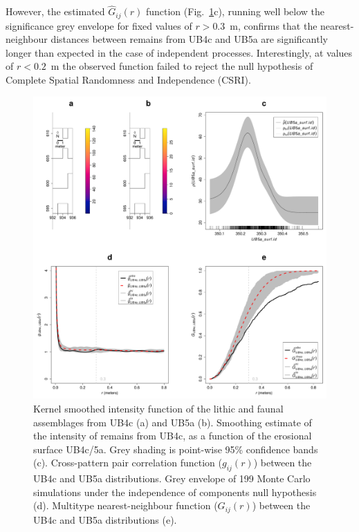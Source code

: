 \documentclass[preprint,authoryear,times]{elsarticle} %
\begin{document}
However, the estimated $\hat{G}_{ij}(r)$ function (Fig.~\ref{fig:12}c), running well below the significance grey envelope for fixed values of $r>0.3$~m, confirms that the nearest-neighbour distances between remains from UB4c and UB5a are significantly longer than expected in the case of independent processes. Interestingly, at values of $r<0.2$~m the observed function failed to reject the null hypothesis of Complete Spatial Randomness and Independence (CSRI).

\begin{figure}[]
  \centering
  \includegraphics[width=1\textwidth]{../artwork/Fig12.pdf}
  \caption{Kernel smoothed intensity function of the lithic and faunal assemblages from UB4c (a) and UB5a (b). Smoothing estimate of the intensity of remains from UB4c, as a function of the erosional surface UB4c/5a. Grey shading is point-wise 95\% confidence bands (c). Cross-pattern pair correlation function ($g_{ij}(r)$) between the UB4c and UB5a distributions. Grey envelope of 199 Monte Carlo simulations under the independence of components null hypothesis (d). Multitype nearest-neighbour function ($G_{ij}(r)$) between the UB4c and UB5a distributions (e).}
  \label{fig:12}
\end{figure}
\end{document}
